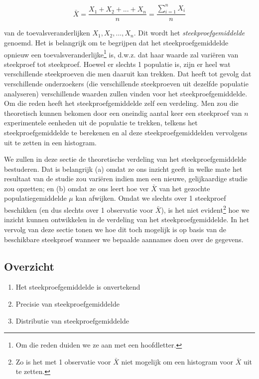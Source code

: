 \documentclass[
  12pt,dutch,coursenotes]{book}
\providecommand{\tightlist}{%
  \setlength{\itemsep}{0pt}\setlength{\parskip}{0pt}}
\theoremstyle{definition}
\theoremstyle{definition}
\theoremstyle{definition}
\theoremstyle{definition}
\theoremstyle{remark}
\begin{document}
\begin{equation*}
\bar X = \frac{X_1+ X_2+ ... + X_n}{n} = \frac{\sum_{i=1}^{n} X_i}{n}
\end{equation*}

van de toevalsveranderlijken \(X_1,X_2, ..., X_n\).
Dit wordt het \emph{steekproefgemiddelde} genoemd.
Het is belangrijk om te begrijpen dat het
steekproefgemiddelde opnieuw een toevalsveranderlijke\footnote{Om die reden duiden we ze aan met een hoofdletter.} is, d.w.z. dat haar
waarde zal variëren van steekproef tot steekproef. Hoewel er
slechts 1 populatie is, zijn er heel wat verschillende steekproeven die men
daaruit kan trekken. Dat heeft tot gevolg dat verschillende onderzoekers
(die verschillende steekproeven uit dezelfde populatie analyseren)
verschillende waarden zullen vinden voor het steekproefgemiddelde. Om die
reden heeft het steekproefgemiddelde zelf een verdeling.
Men zou die theoretisch kunnen bekomen door een oneindig aantal keer een steekproef van \(n\) experimentele eenheden uit de populatie te trekken, telkens het steekproefgemiddelde te berekenen en al deze steekproefgemiddelden vervolgens uit te zetten in een histogram.

We zullen in deze sectie de theoretische verdeling van het steekproefgemiddelde bestuderen.
Dat is belangrijk (a) omdat ze ons inzicht geeft in welke mate het resultaat van de studie zou variëren indien men een nieuwe, gelijkaardige studie zou opzetten; en (b) omdat ze ons leert hoe ver \(\bar X\) van het gezochte populatiegemiddelde \(\mu\) kan afwijken.
Omdat we slechts over 1 steekproef beschikken (en dus slechts over 1 observatie voor \(\bar X\)), is het niet evident\footnote{Zo is het met 1 observatie voor \(\bar X\) niet mogelijk om een histogram voor \(\bar X\) uit te zetten.} hoe we inzicht
kunnen ontwikkelen in de verdeling van het steekproefgemiddelde.
In het vervolg van deze sectie tonen we hoe dit toch mogelijk is op basis van de
beschikbare steekproef wanneer we bepaalde aannames doen over de gegevens.

\hypertarget{overzicht}{%
\subsection{Overzicht}\label{overzicht}}

\begin{enumerate}
\def\labelenumi{\arabic{enumi}.}
\tightlist
\item
  Het steekproefgemiddelde is onvertekend
\item
  Precisie van steekproefgemiddelde
\item
  Distributie van steekproefgemiddelde
\end{enumerate}
\end{document}
